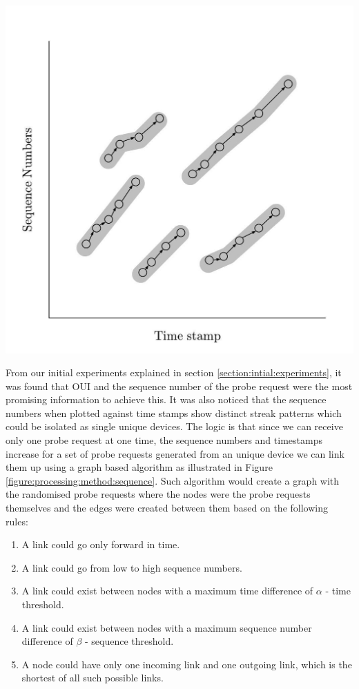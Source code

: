 \begin{marginfigure}
  \includegraphics[trim={5 5 5 5}, clip]{images/processing-method-sequence.jpg}
  \caption{}
  \label{figure:processing:method:sequence}
\end{marginfigure}

From our initial experiments explained in section \ref{section:intial:experiments}, it was found that OUI and the sequence number of the probe request were the most promising information to achieve this.
It was also noticed that the sequence numbers when plotted against time stamps show distinct streak patterns which could be isolated as single unique devices.
The logic is that since we can receive only one probe request at one time, the sequence numbers and timestamps increase for a set of probe requests generated from an unique device we can link them up using a graph based algorithm as illustrated in Figure \ref{figure:processing:method:sequence}.
Such algorithm would create a graph with the randomised probe requests where the nodes were the probe requests themselves and the edges were created between them based on the following rules:

\begin{enumerate}[rightmargin=3em, leftmargin=3em] 
  \itemsep-0.5em
  \item A link could go only forward in time.
  \item A link could go from low to high sequence numbers. 
  \item A link could exist between nodes with a maximum time difference of $\alpha$ - time threshold.
  \item A link could exist between nodes with a maximum sequence number difference of $\beta$ - sequence threshold.
  \item A node could have only one incoming link and one outgoing link, which is the shortest of all such possible links.
\end{enumerate}

